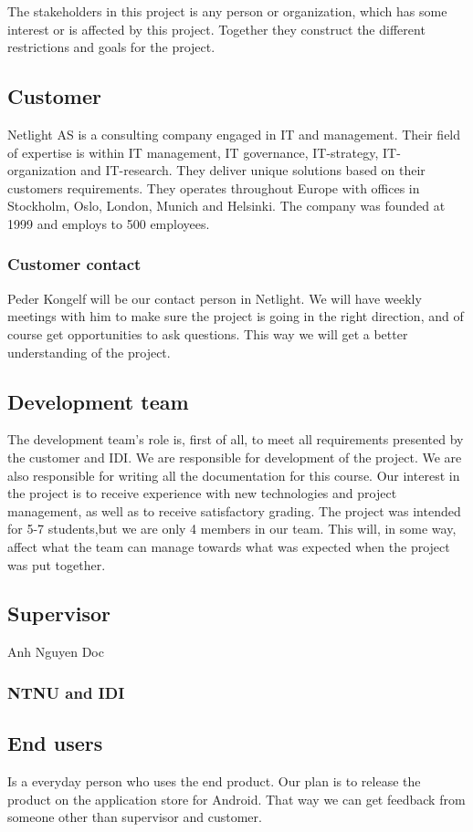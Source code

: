 The stakeholders in this project is any person or organization, which has some interest or is affected by this project. Together they construct the different restrictions and goals for the project.

\subsection{Customer}
Netlight AS is a consulting company engaged in IT and management. Their field of expertise is within IT management, IT governance, IT-strategy, IT-organization and IT-research. They deliver unique solutions based on their customers requirements. They operates throughout Europe with offices in Stockholm, Oslo, London, Munich and Helsinki. The company was founded at 1999 and employs to 500 employees. 
\subsubsection{Customer contact}
Peder Kongelf will be our contact person in Netlight. We will have weekly meetings with him to make sure the project is going in the right direction, and of course get opportunities to ask questions. This way we will get a better understanding of the project.

\subsection{Development team}
 The development team's role is, first of all, to meet all requirements presented by the customer and IDI. We are responsible for development of the project. We are also responsible for writing all the documentation for this course.  Our interest in the project is to receive experience with new technologies and project management, as well as to receive satisfactory grading. The project was intended for 5-7 students,but we are only 4 members in our team. This will, in some way, affect what the team can manage towards what was expected when the project was put together.

\subsection{Supervisor}
Anh Nguyen Doc

\subsubsection{NTNU and IDI}

\subsection{End users}
Is a everyday person who uses the end product. Our plan is to release the product on the application store for Android. That way we can get feedback from someone other than supervisor and customer. 
